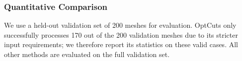 


\subsubsection{Quantitative Comparison}
\label{sec:quantitative}
We use a held-out validation set of 200 meshes for evaluation. 
OptCuts only successfully processes 170 out of the 200 validation meshes due to its stricter input requirements; we therefore report its statistics on these valid cases. All other methods are evaluated on the full validation set.

